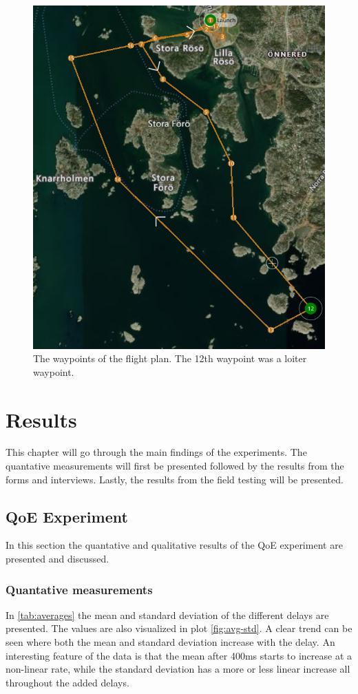 \documentclass[nofilelist]{cslthse-msc}
\begin{document}
\begin{figure}[!hbt]
   \centering
   \includegraphics[scale=0.4]{images/flight-plan.png} 
   \caption{The waypoints of the flight plan. The 12th waypoint was a loiter waypoint.}
   \label{fig:flight-plan}
\end{figure}

\chapter{Results}
This chapter will go through the main findings of the experiments. The quantative measurements will first be presented followed by the results from the forms and interviews. Lastly, the results from the field testing will be presented.

\section{QoE Experiment}
In this section the quantative and qualitative results of the QoE experiment are presented and discussed. 

\subsection{Quantative measurements}
In \ref{tab:averages} the mean and standard deviation of the different delays are presented. The values are also visualized in plot \ref{fig:avg-std}. A clear trend can be seen where both the mean and standard deviation increase with the delay. An interesting feature of the data is that the mean after 400ms starts to increase at a non-linear rate, while the standard deviation has a more or less linear increase all throughout the added delays.
\end{document}
